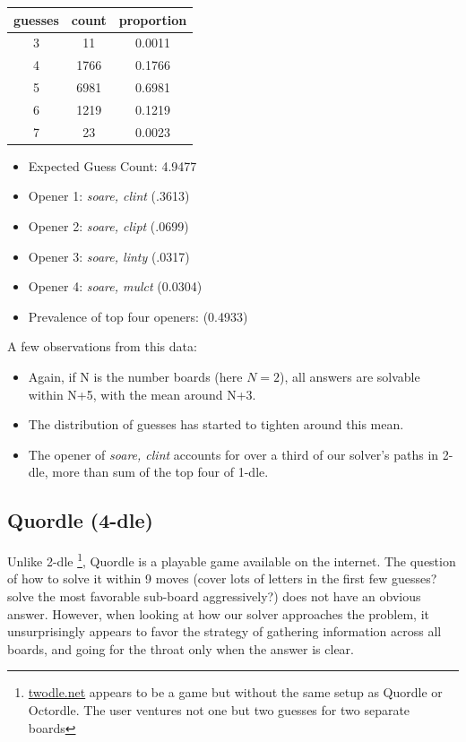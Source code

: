 \documentclass[11pt, oneside]{article} 	%
\begin{document}
\begin{center}
\begin{tabular}{ |c|c|c| }
 \hline
guesses & count & proportion \\
 \hline
3 & 11 & 0.0011 \\
4 & 1766 & 0.1766 \\
5 & 6981 & 0.6981 \\
6 & 1219 & 0.1219 \\
7 & 23 & 0.0023 \\
 \hline
\end{tabular}
\end{center}

\begin{itemize}
\item Expected Guess Count: 4.9477
\item Opener 1: \emph{soare, clint} (.3613)
\item Opener 2: \emph{soare, clipt} (.0699)
\item Opener 3: \emph{soare, linty} (.0317)
\item Opener 4: \emph{soare, mulct} (0.0304)
\item Prevalence of top four openers: (0.4933)
\end{itemize}

A few observations from this data:
\begin{itemize}
\item Again, if N is the number boards (here $N=2$), all answers are solvable within N+5, with the mean around N+3.
\item The distribution of guesses has started to tighten around this mean. 
\item The opener of \emph{soare, clint} accounts for over a third of our solver's paths in 2-dle, more than sum of the top four of 1-dle. 
\end{itemize}


\subsection{Quordle (4-dle)}

Unlike 2-dle \footnote{\url{twodle.net} appears to be a game but without the same setup as Quordle or Octordle. The user ventures not one but two guesses for two separate boards}, Quordle is a playable game available on the internet. The question of how to solve it within 9 moves (cover lots of letters in the first few guesses? solve the most favorable sub-board aggressively?) does not have an obvious answer. However, when looking at how our solver approaches the problem, it unsurprisingly appears to favor the strategy of gathering information across all boards, and going for the throat only when the answer is clear.
\end{document}

